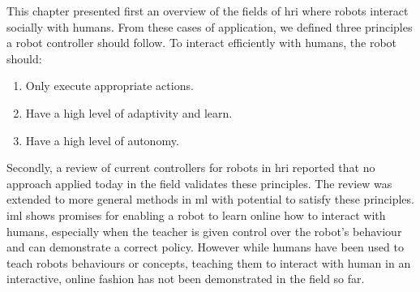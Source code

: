 This chapter presented first an overview of the fields of \gls{hri} where robots interact socially with humans. From these cases of application, we defined three principles a robot controller should follow. To interact efficiently with humans, the robot should:
\begin{enumerate}
   	\item Only execute appropriate actions.
   	\item Have a high level of adaptivity and learn.
   	\item Have a high level of autonomy.
\end{enumerate}

Secondly, a review of current controllers for robots in \gls{hri} reported that no approach applied today in the field validates these principles. The review was extended to more general methods in \gls{ml} with potential to satisfy these principles. \gls{iml} shows promises for enabling a robot to learn online how to interact with humans, especially when the teacher is given control over the robot's behaviour and can demonstrate a correct policy. However while humans have been used to teach robots behaviours or concepts, teaching them to interact with human in an interactive, online fashion has not been demonstrated in the field so far.